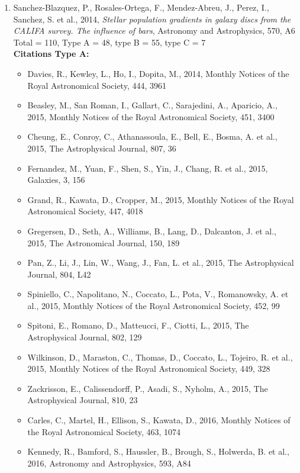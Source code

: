 \documentclass{letter}
\begin{document}
\begin{enumerate}
\begin{itemize}
\end{itemize}
\item Sanchez-Blazquez, P., Rosales-Ortega, F., Mendez-Abreu, J., Perez, I., Sanchez, S. et al., 2014, {\it Stellar population gradients in galaxy discs from the CALIFA survey. The influence of bars}, Astronomy and Astrophysics, 570, A6 \\ 
Total = 110, Type A = 48, type B = 55, type C = 7 \\ 
{\bf Citations Type A:}
\begin{itemize}
\item Davies, R., Kewley, L., Ho, I., Dopita, M., 2014, Monthly Notices of the Royal Astronomical Society, 444, 3961
\item Beasley, M., San Roman, I., Gallart, C., Sarajedini, A., Aparicio, A., 2015, Monthly Notices of the Royal Astronomical Society, 451, 3400
\item Cheung, E., Conroy, C., Athanassoula, E., Bell, E., Bosma, A. et al., 2015, The Astrophysical Journal, 807, 36
\item Fernandez, M., Yuan, F., Shen, S., Yin, J., Chang, R. et al., 2015, Galaxies, 3, 156
\item Grand, R., Kawata, D., Cropper, M., 2015, Monthly Notices of the Royal Astronomical Society, 447, 4018
\item Gregersen, D., Seth, A., Williams, B., Lang, D., Dalcanton, J. et al., 2015, The Astronomical Journal, 150, 189
\item Pan, Z., Li, J., Lin, W., Wang, J., Fan, L. et al., 2015, The Astrophysical Journal, 804, L42
\item Spiniello, C., Napolitano, N., Coccato, L., Pota, V., Romanowsky, A. et al., 2015, Monthly Notices of the Royal Astronomical Society, 452, 99
\item Spitoni, E., Romano, D., Matteucci, F., Ciotti, L., 2015, The Astrophysical Journal, 802, 129
\item Wilkinson, D., Maraston, C., Thomas, D., Coccato, L., Tojeiro, R. et al., 2015, Monthly Notices of the Royal Astronomical Society, 449, 328
\item Zackrisson, E., Calissendorff, P., Asadi, S., Nyholm, A., 2015, The Astrophysical Journal, 810, 23
\item Carles, C., Martel, H., Ellison, S., Kawata, D., 2016, Monthly Notices of the Royal Astronomical Society, 463, 1074
\item Kennedy, R., Bamford, S., Haussler, B., Brough, S., Holwerda, B. et al., 2016, Astronomy and Astrophysics, 593, A84

\end{itemize}
\end{enumerate}
\end{document}
